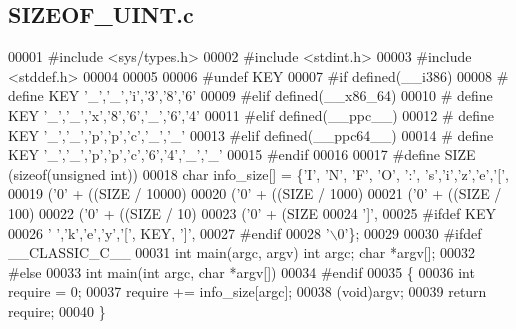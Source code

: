 \subsection{S\+I\+Z\+E\+O\+F\+\_\+\+U\+I\+N\+T.\+c}
\label{SIZEOF__UINT_8c_source}

\begin{DoxyCode}
00001 \textcolor{preprocessor}{#include <sys/types.h>}
00002 \textcolor{preprocessor}{#include <stdint.h>}
00003 \textcolor{preprocessor}{#include <stddef.h>}
00004 
00005 
00006 \textcolor{preprocessor}{#undef KEY}
00007 \textcolor{preprocessor}{#if defined(\_\_i386)}
00008 \textcolor{preprocessor}{# define KEY '\_','\_','i','3','8','6'}
00009 \textcolor{preprocessor}{#elif defined(\_\_x86\_64)}
00010 \textcolor{preprocessor}{# define KEY '\_','\_','x','8','6','\_','6','4'}
00011 \textcolor{preprocessor}{#elif defined(\_\_ppc\_\_)}
00012 \textcolor{preprocessor}{# define KEY '\_','\_','p','p','c','\_','\_'}
00013 \textcolor{preprocessor}{#elif defined(\_\_ppc64\_\_)}
00014 \textcolor{preprocessor}{# define KEY '\_','\_','p','p','c','6','4','\_','\_'}
00015 \textcolor{preprocessor}{#endif}
00016 
00017 \textcolor{preprocessor}{#define SIZE (sizeof(unsigned int))}
00018 \textcolor{keywordtype}{char} info_size[] =  \{\textcolor{charliteral}{'I'}, \textcolor{charliteral}{'N'}, \textcolor{charliteral}{'F'}, \textcolor{charliteral}{'O'}, \textcolor{charliteral}{':'}, \textcolor{charliteral}{'s'},\textcolor{charliteral}{'i'},\textcolor{charliteral}{'z'},\textcolor{charliteral}{'e'},\textcolor{charliteral}{'['},
00019   (\textcolor{charliteral}{'0'} + ((SIZE / 10000)%
00020   (\textcolor{charliteral}{'0'} + ((SIZE / 1000)%
00021   (\textcolor{charliteral}{'0'} + ((SIZE / 100)%
00022   (\textcolor{charliteral}{'0'} + ((SIZE / 10)%
00023   (\textcolor{charliteral}{'0'} +  (SIZE    %
00024   \textcolor{charliteral}{']'},
00025 \textcolor{preprocessor}{#ifdef KEY}
00026   \textcolor{charliteral}{' '},\textcolor{charliteral}{'k'},\textcolor{charliteral}{'e'},\textcolor{charliteral}{'y'},\textcolor{charliteral}{'['}, KEY, \textcolor{charliteral}{']'},
00027 \textcolor{preprocessor}{#endif}
00028   \textcolor{charliteral}{'\(\backslash\)0'}\};
00029 
00030 \textcolor{preprocessor}{#ifdef \_\_CLASSIC\_C\_\_}
00031 \textcolor{keywordtype}{int} main(argc, argv) \textcolor{keywordtype}{int} argc; \textcolor{keywordtype}{char} *argv[];
00032 \textcolor{preprocessor}{#else}
00033 \textcolor{keywordtype}{int} main(\textcolor{keywordtype}{int} argc, \textcolor{keywordtype}{char} *argv[])
00034 \textcolor{preprocessor}{#endif}
00035 \{
00036   \textcolor{keywordtype}{int} require = 0;
00037   require += info_size[argc];
00038   (void)argv;
00039   \textcolor{keywordflow}{return} require;
00040 \}
\end{DoxyCode}
